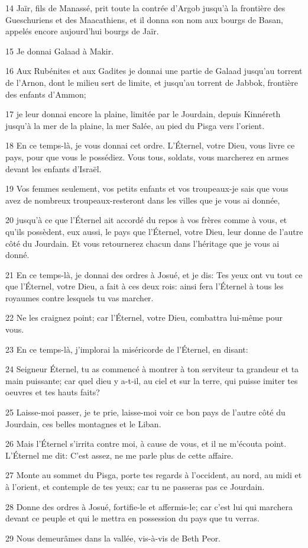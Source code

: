 \par 14 Jaïr, fils de Manassé, prit toute la contrée d'Argob jusqu'à la frontière des Gueschuriens et des Maacathiens, et il donna son nom aux bourgs de Basan, appelés encore aujourd'hui bourgs de Jaïr.
\par 15 Je donnai Galaad à Makir.
\par 16 Aux Rubénites et aux Gadites je donnai une partie de Galaad jusqu'au torrent de l'Arnon, dont le milieu sert de limite, et jusqu'au torrent de Jabbok, frontière des enfants d'Ammon;
\par 17 je leur donnai encore la plaine, limitée par le Jourdain, depuis Kinnéreth jusqu'à la mer de la plaine, la mer Salée, au pied du Pisga vers l'orient.
\par 18 En ce temps-là, je vous donnai cet ordre. L'Éternel, votre Dieu, vous livre ce pays, pour que vous le possédiez. Vous tous, soldats, vous marcherez en armes devant les enfants d'Israël.
\par 19 Vos femmes seulement, vos petits enfants et vos troupeaux-je sais que vous avez de nombreux troupeaux-resteront dans les villes que je vous ai donnée,
\par 20 jusqu'à ce que l'Éternel ait accordé du repos à vos frères comme à vous, et qu'ils possèdent, eux aussi, le pays que l'Éternel, votre Dieu, leur donne de l'autre côté du Jourdain. Et vous retournerez chacun dans l'héritage que je vous ai donné.
\par 21 En ce temps-là, je donnai des ordres à Josué, et je dis: Tes yeux ont vu tout ce que l'Éternel, votre Dieu, a fait à ces deux rois: ainsi fera l'Éternel à tous les royaumes contre lesquels tu vas marcher.
\par 22 Ne les craignez point; car l'Éternel, votre Dieu, combattra lui-même pour vous.
\par 23 En ce temps-là, j'implorai la miséricorde de l'Éternel, en disant:
\par 24 Seigneur Éternel, tu as commencé à montrer à ton serviteur ta grandeur et ta main puissante; car quel dieu y a-t-il, au ciel et sur la terre, qui puisse imiter tes oeuvres et tes hauts faits?
\par 25 Laisse-moi passer, je te prie, laisse-moi voir ce bon pays de l'autre côté du Jourdain, ces belles montagnes et le Liban.
\par 26 Mais l'Éternel s'irrita contre moi, à cause de vous, et il ne m'écouta point. L'Éternel me dit: C'est assez, ne me parle plus de cette affaire.
\par 27 Monte au sommet du Pisga, porte tes regards à l'occident, au nord, au midi et à l'orient, et contemple de tes yeux; car tu ne passeras pas ce Jourdain.
\par 28 Donne des ordres à Josué, fortifie-le et affermis-le; car c'est lui qui marchera devant ce peuple et qui le mettra en possession du pays que tu verras.
\par 29 Nous demeurâmes dans la vallée, vis-à-vis de Beth Peor.

